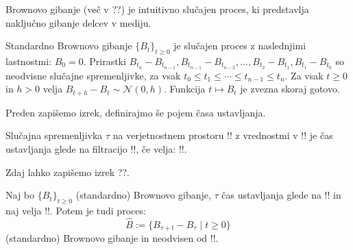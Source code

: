 \documentclass[11pt]{article}
\begin{document}
Brownovo gibanje (več v ??) je intuitivno slučajen proces, %
ki predstavlja naključno gibanje delcev v mediju.
    

    Standardno Brownovo gibanje \(\{B_t\}_{t \geq 0}\) je slučajen proces z naslednjimi lastnostmi: 
        \(B_0 = 0\).
        Prirastki \(B_{t_n} - B_{t_{n-1}}, B_{t_{n-1}} - B_{t_{n-2}}, \ldots, B_{t_2} - B_{t_1}, B_{t_1} - B_{t_0}\) so neodvisne slučajne spremenljivke, za vsak \(t_0 \leq t_1 \leq \cdots \leq t_{n-1} \leq t_n\).
        Za vsak \(t \geq 0\) in \(h > 0\) velja \(B_{t+h} - B_t \sim \mathcal{N}(0, h)\).
        Funkcija \(t \mapsto B_t\) je zvezna skoraj gotovo.
    
    Preden zapišemo izrek, definirajmo še pojem časa ustavljanja.
    
    Slučajna spremenljivka \(\tau\) na verjetnostnem prostoru !! z vrednostmi v !!
    je čas ustavljanja glede na filtracijo !!, če velja: !!.
    
    Zdaj lahko zapišemo izrek ??. %
    
    Naj bo \(\{B_t\}_{t \geq 0}\) (standardno) Brownovo gibanje, \(\tau\) čas ustavljanja glede na
    !! in naj velja !!.
    Potem je tudi proces:
    \[
    \hat{B} := \{B_{\tau+t} - B_\tau \mid t \geq 0\}
    \]
    (standardno) Brownovo gibanje in neodvisen od !!.
    
\end{document}
